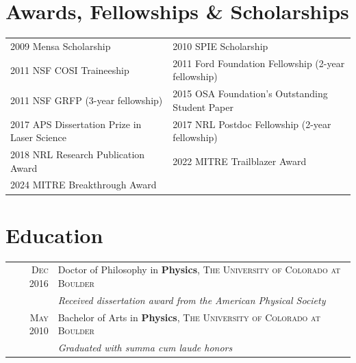 \documentclass[letterpaper,12pt]{article}
\begin{document}
\vspace{-0.1cm}
\section{Awards, Fellowships \& Scholarships}
\begin{table}[h!]
	\centering
	\begin{tabular}{l | l  }
		 2009 Mensa Scholarship &  2010 SPIE Scholarship\\
		 2011 NSF COSI Traineeship &  2011 Ford Foundation Fellowship \footnotesize(2-year fellowship)\normalsize \\
		 2011 NSF GRFP \footnotesize(3-year fellowship)\normalsize & 2015 OSA Foundation's Outstanding Student Paper\\
		 2017 APS Dissertation Prize in Laser Science &  2017 NRL Postdoc Fellowship \footnotesize(2-year fellowship)\normalsize\\
		 2018 NRL Research Publication Award &  2022 MITRE Trailblazer Award  \\
		 2024 MITRE Breakthrough Award & \\
	\end{tabular}
\end{table}

\vspace{-0.1cm}
\section{Education}
\begin{tabular}{rl}	
	\textsc{Dec} 2016 & Doctor of Philosophy in \textbf{Physics}, \textsc{The University of Colorado at Boulder}\\
	\vspace{0.5cm}
	& \small\emph{Received dissertation award from the American Physical Society }\\
	\textsc{May} 2010 & Bachelor of Arts in \textbf{Physics}, \textsc{The University of Colorado at Boulder}\\
	& \small \textit{Graduated with summa cum laude honors}\\
\end{tabular}

\vspace{-0.3cm}
\end{document}
